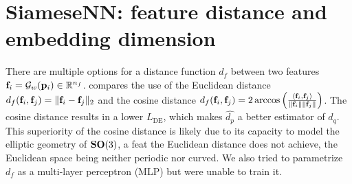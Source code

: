 \section{SiameseNN: feature distance and embedding dimension}\label{apx:siamese:feature-distance-and-embedding-dimension}


There are multiple options for a distance function $d_f$ between two features $\mathbf{f}_i = \mathcal{G}_w(\mathbf{p}_i) \in \mathbb{R}^{n_f}$.
 compares the use of the Euclidean distance $d_f(\mathbf{f}_i, \mathbf{f}_j) = \Vert \mathbf{f}_i - \mathbf{f}_j \Vert_2$ and the cosine distance $d_f(\mathbf{f}_i, \mathbf{f}_j) = 2 \arccos \left( \frac{\langle \mathbf{f}_i, \mathbf{f}_j \rangle}{\lVert \mathbf{f}_i \rVert \lVert \mathbf{f}_j \rVert} \right)$. The cosine distance results in a lower $L_\text{DE}$, which makes $\widehat{d_p}$ a better estimator of $d_q$.
This superiority of the cosine distance is likely due to its capacity to model the elliptic geometry of $\mathrm{\mathbf{SO}}(3)$, a feat the Euclidean distance does not achieve, the Euclidean space being neither periodic nor curved.
We also tried to parametrize $d_f$ as a multi-layer perceptron (MLP) but were unable to train it.


